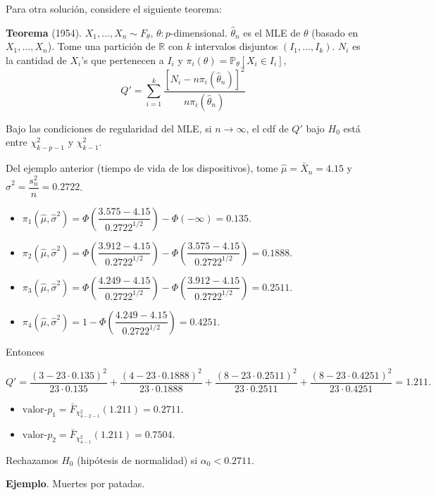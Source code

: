 \documentclass[
  12pt,
]{book}
\begin{document}
Para otra solución, considere el siguiente teorema:

\textbf{Teorema} (1954). \(X_1,\dots, X_n\sim F_\theta\), \(\theta: p\)-dimensional. \(\hat\theta_n\) es el MLE de \(\theta\) (basado en \(X_1,\dots, X_n\)). Tome una partición de \(\mathbb R\) con \(k\) intervalos disjuntos \((I_1,\dots,I_k)\). \(N_i\) es la cantidad de \(X_i\)'s que pertenecen a \(I_i\) y \(\pi_i(\theta)=\mathbb P_\theta[X_i\in I_i]\),
\[Q' = \sum_{i=1}^k\dfrac{[N_i-n\pi_i(\hat\theta_n)]^2}{n\pi_i(\hat\theta_n)}\]

Bajo las condiciones de regularidad del MLE, si \(n\to\infty\), el cdf de \(Q'\) bajo \(H_0\) está entre \(\chi^2_{k-p-1}\) y \(\chi^2_{k-1}\).

Del ejemplo anterior (tiempo de vida de los dispositivos), tome \(\hat\mu = \bar X_n = 4.15\) y \(\hat\sigma^2 = \dfrac{s_n^2}{n} = 0.2722\).

\begin{itemize}
\item
  \(\pi_1(\hat\mu,\hat\sigma^2) = \Phi\left(\dfrac{3.575-4.15}{0.2722^{1/2}}\right)-\Phi(-\infty) = 0.135\).
\item
  \(\pi_2(\hat\mu,\hat\sigma^2) = \Phi\left(\dfrac{3.912-4.15}{0.2722^{1/2}}\right) - \Phi\left(\dfrac{3.575-4.15}{0.2722^{1/2}}\right) = 0.1888\).
\item
  \(\pi_3(\hat\mu,\hat\sigma^2) = \Phi\left(\dfrac{4.249-4.15}{0.2722^{1/2}}\right) - \Phi\left(\dfrac{3.912-4.15}{0.2722^{1/2}}\right) = 0.2511\).
\item
  \(\pi_4(\hat\mu,\hat\sigma^2) = 1 - \Phi\left(\dfrac{4.249-4.15}{0.2722^{1/2}}\right) = 0.4251\).
\end{itemize}

Entonces

\[Q' = \dfrac{(3-23\cdot 0.135)^2}{23\cdot 0.135} + \dfrac{(4-23\cdot 0.1888)^2}{23\cdot 0.1888} + \dfrac{(8-23\cdot 0.2511)^2}{23\cdot 0.2511} +\dfrac{(8-23\cdot 0.4251)^2}{23\cdot 0.4251}  = 1.211.\]

\begin{itemize}
\item
  \(\text{valor-}p_1 = \bar F_{\chi^2_{4-2-1}}(1.211) = 0.2711\).
\item
  \(\text{valor-}p_2 = \bar F_{\chi^2_{4-1}}(1.211) = 0.7504\).
\end{itemize}

Rechazamos \(H_0\) (hipótesis de normalidad) si \(\alpha_0<0.2711\).

\textbf{Ejemplo}. Muertes por patadas.
\end{document}
